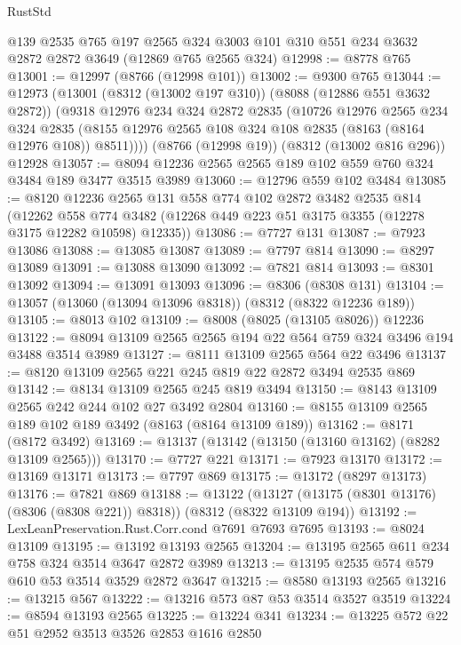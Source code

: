 \begin{lexlean}{RustStd}
\begin{coremodule}
    @139
    @2535
    @765
    @197
    @2565
    @324
    @3003
    @101
    @310
    @551
    @234
    @3632
    @2872
    @2872
    @3649
    (@12869 @765 @2565 @324)
@12998 := @8778 @765
@13001 := @12997 (@8766 (@12998 @101))
@13002 := @9300 @765
@13044 := @12973
    (@13001
      (@8312 (@13002 @197 @310))
      (@8088 (@12886 @551 @3632 @2872))
      (@9318
        @12976
        @234
        @324
        @2872
        @2835
        (@10726
          @12976
          @2565
          @234
          @324
          @2835
          (@8155 @12976 @2565 @108 @324 @108 @2835 (@8163 (@8164 @12976 @108)) @8511))))
    (@8766 (@12998 @19))
    (@8312 (@13002 @816 @296))
    @12928
@13057 := @8094 @12236 @2565 @2565 @189 @102 @559 @760 @324 @3484 @189 @3477 @3515 @3989
@13060 := @12796 @559 @102 @3484
@13085 := @8120
    @12236
    @2565
    @131
    @558
    @774
    @102
    @2872
    @3482
    @2535
    @814
    (@12262 @558 @774 @3482 (@12268 @449 @223 @51 @3175 @3355 (@12278 @3175 @12282 @10598) @12335))
@13086 := @7727 @131
@13087 := @7923 @13086
@13088 := @13085 @13087
@13089 := @7797 @814
@13090 := @8297 @13089
@13091 := @13088 @13090
@13092 := @7821 @814
@13093 := @8301 @13092
@13094 := @13091 @13093
@13096 := @8306 (@8308 @131)
@13104 := @13057 (@13060 (@13094 @13096 @8318)) (@8312 (@8322 @12236 @189))
@13105 := @8013 @102
@13109 := @8008 (@8025 (@13105 @8026)) @12236
@13122 := @8094 @13109 @2565 @2565 @194 @22 @564 @759 @324 @3496 @194 @3488 @3514 @3989
@13127 := @8111 @13109 @2565 @564 @22 @3496
@13137 := @8120 @13109 @2565 @221 @245 @819 @22 @2872 @3494 @2535 @869
@13142 := @8134 @13109 @2565 @245 @819 @3494
@13150 := @8143 @13109 @2565 @242 @244 @102 @27 @3492 @2804
@13160 := @8155 @13109 @2565 @189 @102 @189 @3492 (@8163 (@8164 @13109 @189))
@13162 := @8171 (@8172 @3492)
@13169 := @13137 (@13142 (@13150 (@13160 @13162) (@8282 @13109 @2565)))
@13170 := @7727 @221
@13171 := @7923 @13170
@13172 := @13169 @13171
@13173 := @7797 @869
@13175 := @13172 (@8297 @13173)
@13176 := @7821 @869
@13188 := @13122
    (@13127 (@13175 (@8301 @13176) (@8306 (@8308 @221)) @8318))
    (@8312 (@8322 @13109 @194))
@13192 := LexLeanPreservation.Rust.Corr.cond @7691 @7693 @7695
@13193 := @8024 @13109
@13195 := @13192 @13193 @2565
@13204 := @13195 @2565 @611 @234 @758 @324 @3514 @3647 @2872 @3989
@13213 := @13195 @2535 @574 @579 @610 @53 @3514 @3529 @2872 @3647
@13215 := @8580 @13193 @2565
@13216 := @13215 @567
@13222 := @13216 @573 @87 @53 @3514 @3527 @3519
@13224 := @8594 @13193 @2565
@13225 := @13224 @341
@13234 := @13225 @572 @22 @51 @2952 @3513 @3526 @2853 @1616 @2850

\end{coremodule}
\end{lexlean}
